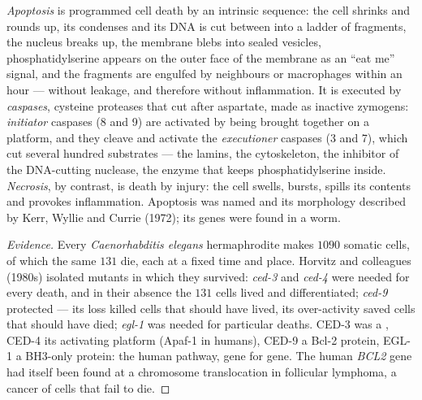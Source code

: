 \begin{definition}[Apoptosis]\label{def:b3:cell-cycle-apoptosis:apoptosis}
\emph{Apoptosis} is programmed cell death by an intrinsic sequence: the
cell shrinks and rounds up, its  condenses and its DNA is cut
between  into a ladder of fragments, the nucleus breaks up,
the membrane blebs into sealed vesicles, phosphatidylserine appears on
the outer face of the membrane as an ``eat me'' signal, and the
fragments are engulfed by neighbours or macrophages within an hour ---
without leakage, and therefore without inflammation. It is executed by
\emph{caspases}, cysteine proteases that cut after aspartate, made as
inactive zymogens: \emph{initiator} caspases (8 and 9) are activated by
being brought together on a platform, and they cleave and activate the
\emph{executioner} caspases (3 and 7), which cut several hundred
substrates --- the lamins, the cytoskeleton, the inhibitor of the
DNA-cutting nuclease, the enzyme that keeps phosphatidylserine inside.
\emph{Necrosis}, by contrast, is death by injury: the cell swells,
bursts, spills its contents and provokes inflammation. Apoptosis was
named and its morphology described by Kerr, Wyllie and Currie (1972);
its genes were found in a worm.
\end{definition}

\begin{proof}[Evidence]
Every \emph{Caenorhabditis elegans} hermaphrodite makes $1090$ somatic
cells, of which the same $131$ die, each at a fixed time and place.
Horvitz and colleagues (1980s) isolated mutants in which they survived:
\emph{ced-3} and \emph{ced-4} were needed for every death, and in their
absence the $131$ cells lived and differentiated; \emph{ced-9}
protected --- its loss killed cells that should have lived, its
over-activity saved cells that should have died; \emph{egl-1} was
needed for particular deaths. CED-3 was a , CED-4 its
activating platform (Apaf-1 in humans), CED-9 a Bcl-2 protein, EGL-1 a
BH3-only protein: the human pathway, gene for gene. The human
\emph{BCL2} gene had itself been found at a chromosome translocation in
follicular lymphoma, a cancer of cells that fail to die.
\end{proof}

